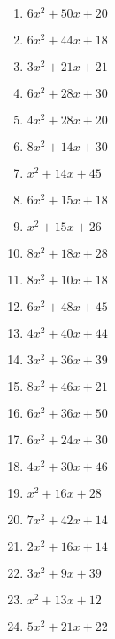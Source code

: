 \documentclass[9pt,dvipdfmx,a4paper]{article}
\begin{document}
\begin{multicols}{2}
\begin{enumerate}
\item
$ 6 x^{2} + 50 x + 20$

\item
$ 6 x^{2} + 44 x + 18$

\item
$ 3 x^{2} + 21 x + 21$

\item
$ 6 x^{2} + 28 x + 30$

\item
$ 4 x^{2} + 28 x + 20$

\item
$ 8 x^{2} + 14 x + 30$

\item
$ x^{2} + 14 x + 45$

\item
$ 6 x^{2} + 15 x + 18$

\item
$ x^{2} + 15 x + 26$

\item
$ 8 x^{2} + 18 x + 28$

\item
$ 8 x^{2} + 10 x + 18$

\item
$ 6 x^{2} + 48 x + 45$

\item
$ 4 x^{2} + 40 x + 44$

\item
$ 3 x^{2} + 36 x + 39$

\item
$ 8 x^{2} + 46 x + 21$

\item
$ 6 x^{2} + 36 x + 50$

\item
$ 6 x^{2} + 24 x + 30$

\item
$ 4 x^{2} + 30 x + 46$

\item
$ x^{2} + 16 x + 28$

\item
$ 7 x^{2} + 42 x + 14$

\item
$ 2 x^{2} + 16 x + 14$

\item
$ 3 x^{2} + 9 x + 39$

\item
$ x^{2} + 13 x + 12$

\item
$ 5 x^{2} + 21 x + 22$


\end{enumerate}
\end{multicols}
\end{document}
